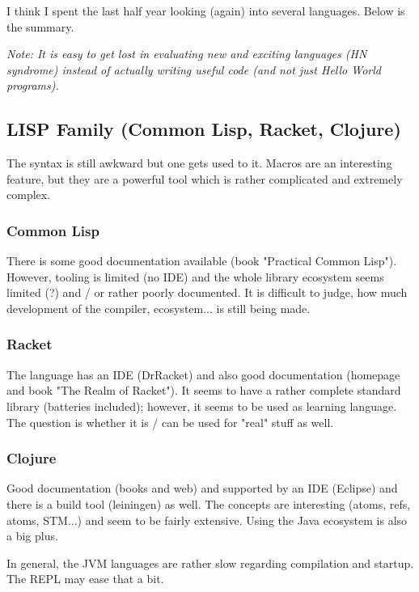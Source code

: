
I think I spent the last half year looking (again) into several languages. Below is the summary.

\emph{Note: It is easy to get lost in evaluating new and exciting languages (HN syndrome) instead of actually writing useful code (and not just Hello World programs).}

\subsection{LISP Family (Common Lisp, Racket, Clojure)}

The syntax is still awkward but one gets used to it. Macros are an interesting feature, but they are a powerful tool which is rather complicated and extremely complex.

\subsubsection{Common Lisp}

There is some good documentation available (book "Practical Common Lisp"). However, tooling is limited (no IDE) and the whole library ecosystem seems limited (?) and / or rather poorly documented. It is difficult to judge, how much development of the compiler, ecosystem... is still being made.

\subsubsection{Racket}

The language has an IDE (DrRacket) and also good documentation (homepage and book "The Realm of Racket"). It seems to have a rather complete standard library (batteries included); however, it seems to be used as learning language. The question is whether it is / can be used for "real" stuff as well.

\subsubsection{Clojure}

Good documentation (books and web) and supported by an IDE (Eclipse) and there is a build tool (leiningen) as well. The concepts are interesting (atoms, refs, atoms, STM...) and seem to be fairly extensive. Using the Java ecosystem is also a big plus.

In general, the JVM languages are rather slow regarding compilation and startup. The REPL may ease that a bit.

